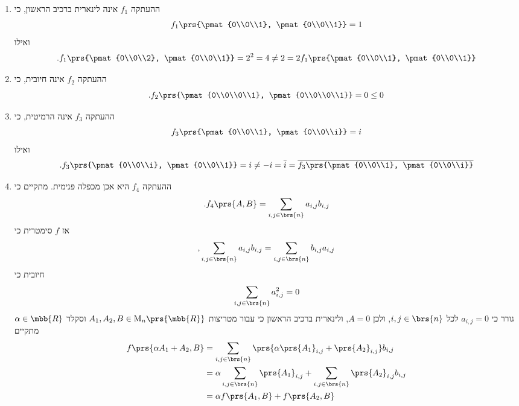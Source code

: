 \documentclass[a4paper,10pt,twoside,openany]{book}
\renewcommand{\Mat}{\mathrm{M}}
\begin{document}
\begin{solution}
\begin{enumerate}
\item
ההעתקה
$f_1$
אינה לינארית ברכיב הראשון, כי
\[f_1\prs{\pmat{0\\0\\1}, \pmat{0\\0\\1}} = 1\]
ואילו
\[\text{.} f_1\prs{\pmat{0\\0\\2}, \pmat{0\\0\\1}} = 2^2 = 4 \neq 2 = 2 f_1\prs{\pmat{0\\0\\1}, \pmat{0\\0\\1}}\]

\item
ההעתקה
$f_2$
אינה חיובית, כי
\[\text{.} f_2\prs{\pmat{0\\0\\0\\1}, \pmat{0\\0\\0\\1}} = 0 \leq 0\]

\item
ההעתקה
$f_3$
אינה הרמיטית, כי
\[f_3\prs{\pmat{0\\0\\1}, \pmat{0\\0\\i}} = i\]
ואילו
\[\text{.} f_3\prs{\pmat{0\\0\\i}, \pmat{0\\0\\1}} = i \neq -i = \bar{i} = \overline{f_3\prs{\pmat{0\\0\\1}, \pmat{0\\0\\i}}}\]

\item
ההעתקה
$f_4$
היא אכן מכפלה פנימית.
מתקיים כי
\[\text{.} f_4\prs{A,B} = \sum_{i,j \in \brs{n}} a_{i,j} b_{i,j}\]
אז
$f$
סימטרית כי
\[ \text{,} \sum_{i,j \in \brs{n}} a_{i,j} b_{i,j} = \sum_{i,j \in \brs{n}} b_{i,j} a_{i,j} \]
חיובית כי
\[ \sum_{i,j \in \brs{n}} a_{i,j}^2 = 0 \]
גורר כי
$a_{i,j} = 0$
לכל
$i,j \in \brs{n}$,
ולכן
$A = 0$,
ולינארית ברכיב הראשון כי עבור מטריצות
$A_1, A_2, B \in \Mat_n\prs{\mbb{R}}$
וסקלר
$\alpha \in \mbb{R}$
מתקיים
\begin{align*}
f\prs{\alpha A_1 + A_2, B}
&=
\sum_{i,j \in \brs{n}} \prs{\alpha \prs{A_1}_{i,j} + \prs{A_2}_{i,j}} b_{i,j}
\\&=
\alpha \sum_{i,j \in \brs{n}} \prs{A_1}_{i,j} + \sum_{i,j \in \brs{n}} \prs{A_2}_{i,j} b_{i,j}
\\
\hphantom{f\prs{\alpha A_1 + A_2, B}}
&=
\alpha f\prs{A_1, B} + f\prs{A_2, B}
\end{align*}


\end{enumerate}
\end{solution}
\end{document}
